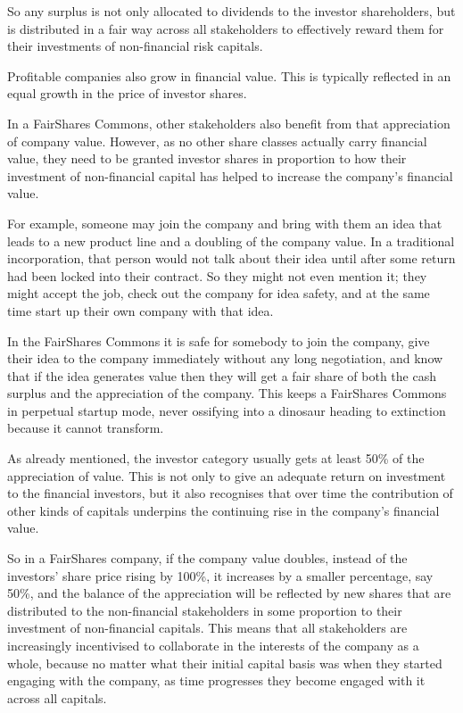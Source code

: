 So any surplus is not only allocated to dividends to the investor shareholders, but is distributed in a fair way across all stakeholders to effectively reward them for their investments of non-financial risk capitals.


Profitable companies also grow in financial value. This is typically reflected in an equal growth in the price of investor shares.


In a FairShares Commons, other stakeholders also benefit from that appreciation of company value. However, as no other share classes actually carry financial value, they need to be granted investor shares in proportion to how their investment of non-financial capital has helped to increase the company’s financial value.


For example, someone may join the company and bring with them an idea that leads to a new product line and a doubling of the company value. In a traditional incorporation, that person would not talk about their idea until after some return had been locked into their contract. So they might not even mention it; they might accept the job, check out the company for idea safety, and at the same time start up their own company with that idea.


In the FairShares Commons it is safe for somebody to join the company, give their idea to the company immediately without any long negotiation, and know that if the idea generates value then they will get a fair share of both the cash surplus and the appreciation of the company. This keeps a FairShares Commons in perpetual startup mode, never ossifying into a dinosaur heading to extinction because it cannot transform.


As already mentioned, the investor category usually gets at least 50\% of the appreciation of value. This is not only to give an adequate return on investment to the financial investors, but it also recognises that over time the contribution of other kinds of capitals underpins the continuing rise in the company’s financial value.


So in a FairShares company, if the company value doubles, instead of the investors' share price rising by 100\%, it increases by a smaller percentage, say 50\%, and the balance of the appreciation will be reflected by new shares that are distributed to the non-financial stakeholders in some proportion to their investment of non-financial capitals.
This means that all stakeholders are increasingly incentivised to collaborate in the interests of the company as a whole, because no matter what their initial capital basis was when they started engaging with the company, as time progresses they become engaged with it across all capitals.


